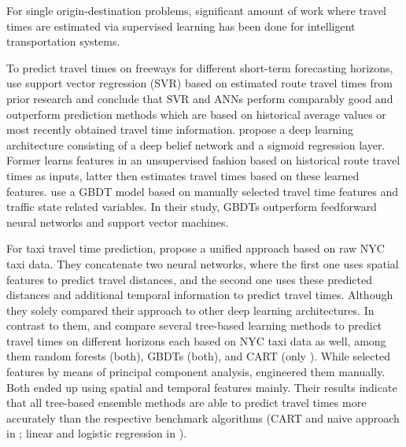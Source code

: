 For single origin-destination problems, significant amount of work where travel times are estimated via supervised learning has been done for intelligent transportation systems. 

To predict travel times on freeways for different short-term forecasting horizons, \cite{Vanajakshi2007} use support vector regression (SVR) based on estimated route travel times from prior research and conclude that SVR and ANNs perform comparably good and outperform prediction methods which are based on historical average values or most recently obtained travel time information. 
\cite{Siripanpornchana2016_AnnWithDbnFS} propose a deep learning architecture consisting of a deep belief network and a sigmoid regression layer. Former learns features in an unsupervised fashion based on historical route travel times as inputs, latter then estimates travel times based on these learned features. \cite{Cheng2019_GBDT} use a GBDT model based on manually selected travel time features and traffic state related variables. In their study, GBDTs outperform feedforward neural networks and support vector machines.

For taxi travel time prediction, \cite{jindal2017unified} propose a unified approach based on raw NYC taxi data. They concatenate two neural networks, where the first one uses spatial features to predict travel distances, and the second one uses these predicted distances and additional temporal information to predict travel times. Although they solely compared their approach to other deep learning architectures.
In contrast to them, \cite{Huang2018_GBDT} and \cite{huang2020travel_GBDT} compare several tree-based learning methods to predict travel times on different horizons each based on NYC taxi data as well, among them random forests (both), GBDTs (both), and CART (only \cite{huang2020travel_GBDT}). While \cite{Huang2018_GBDT} selected features by means of principal component analysis, \cite{huang2020travel_GBDT} engineered them manually. Both ended up using spatial and temporal features mainly. Their results indicate that all tree-based ensemble methods are able to predict travel times more accurately than the respective benchmark algorithms (CART and naive approach in \cite{huang2020travel_GBDT}; linear and logistic regression in \cite{Huang2018_GBDT}).


